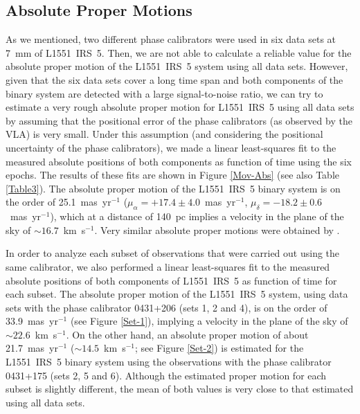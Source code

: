 \documentclass[debug]{rmaa}
\begin{document}
\subsection{Absolute Proper Motions}
\label{APM}
As we mentioned, two different phase calibrators were used in six data sets at
7~mm of L1551~IRS~5. Then, we are not able to calculate a reliable value for the
absolute proper motion of the L1551~IRS~5 system using all data sets. However,
given that the six data sets cover a long time span and both components of the
binary system are detected with a large signal-to-noise ratio, we can try to estimate
a very rough absolute proper motion for L1551~IRS~5 using all data sets by assuming
that the positional error of the phase calibrators (as observed by the VLA) is very
small. Under this assumption (and considering the positional uncertainty of the phase
calibrators), we made a linear least-squares fit to the measured
absolute positions of both components as function of time using the six epochs.
The results of these fits are shown in Figure \ref{Mov-Abs} (see also Table 
\ref{Table3}). The absolute proper motion of the L1551~IRS~5 binary system is 
on the order of  25.1~mas~yr$^{-1}$ ($\mu_{\alpha}=+17.4 \pm 4.0$~mas~yr$^{-1}$, 
$\mu_{\delta}=-18.2 \pm 0.6$~mas~yr$^{-1}$), which at a distance of 140~pc implies 
a velocity in the plane of the sky of $\sim 16.7$~km~s$^{-1}$. Very similar absolute
proper motions  were obtained  by \citet{Rodriguez2003}.


In order to analyze each subset of observations that were carried out using the 
same calibrator, we also performed a linear least-squares fit to the measured
absolute positions of both components of L1551~IRS~5 as function of time
for each subset. The absolute proper motion of the L1551~IRS~5 system, using 
data sets with the phase calibrator 0431+206
(sets 1, 2 and 4), is on the order of 33.9~mas~yr$^{-1}$ (see Figure \ref{Set-1}), 
implying a velocity in the plane of the sky of $\sim 22.6$~km~s$^{-1}$.
On the other hand, an absolute proper motion of about 21.7~mas~yr$^{-1}$
($\sim 14.5$~km~s$^{-1}$; see Figure \ref{Set-2}) is estimated for the L1551~IRS~5 
binary system using the observations with the phase calibrator 0431+175
(sets 2, 5 and 6). 
Although the estimated proper motion for each subset is slightly different,
the mean of both values is very close to that estimated using all data sets.
\end{document}
